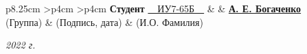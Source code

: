 \begin{titlepage}
\begin{table}[h!]
		\addvspace{3pt}
		
		\hspace*{-10pt}\begin{signstabular}[0.55]{p{8.25cm} >{\centering\arraybackslash}p{4cm} >{\centering\arraybackslash}p{4cm}}
			\textbf{Студент} \uline{~~ИУ7-65Б~~} & \uline{\mbox{\hspace*{4cm}}} & \uline{\hfill \textbf{А. Е. Богаченко} \hfill} \\
			\scriptsize \hspace*{2.7cm}(Группа)	& \scriptsize (Подпись, дата) & \scriptsize (И.О. Фамилия)
		\end{signstabular}
		
	\end{table}
	
	\vfill
	
	\begin{center}
		\normalsize \textit{2022 г.}
	\end{center}
\end{titlepage}